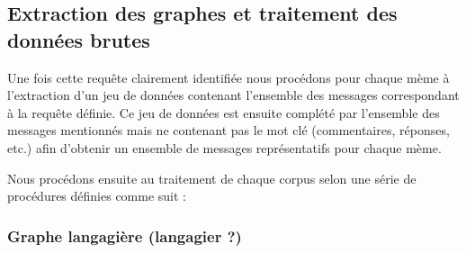 





\subsection{Extraction des graphes et traitement des donn\'ees brutes}
Une fois cette requ\^ete clairement identifi\'ee nous proc\'edons pour
chaque m\`eme \`a l{\textquoteright}extraction d{\textquoteright}un jeu
de donn\'ees contenant l{\textquoteright}ensemble des messages
correspondant \`a la requ\^ete d\'efinie. Ce jeu de donn\'ees est
ensuite compl\'et\'e par l{\textquoteright}ensemble des messages
mentionn\'es mais ne contenant pas le mot cl\'e (commentaires,
r\'eponses, etc.) afin d{\textquoteright}obtenir un ensemble de
messages repr\'esentatifs pour chaque m\`eme.

Nous proc\'edons ensuite au traitement de chaque corpus selon une
s\'erie de proc\'edures d\'efinies comme suit :

\subsubsection{Graphe langagi\`ere (langagier ?)}


